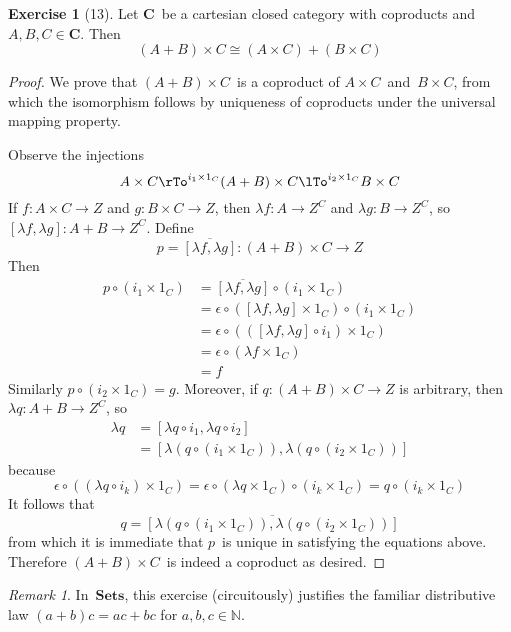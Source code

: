 \documentclass[letterpaper,12pt]{article}
\newcommand{\N}{\mathbb{N}}
\newcommand{\iso}{\cong}
\newcommand{\after}{\circ}
\newcommand{\eval}{\epsilon}
\newcommand{\copair}[2]{[{#1},{#2}]}
\newcommand{\cat}[1]{\mathbf{#1}}
\newcommand{\curry}[1]{\lambda{#1}}
\newcommand{\uncurry}[1]{\overline{#1}}
\newcommand{\C}{\cat{C}}
\newcommand{\Sets}{\cat{Sets}}
\theoremstyle{definition}
\newtheorem*{exer}{Exercise}
\theoremstyle{remark}
\newtheorem*{rmk}{Remark}
\theoremstyle{direction}
\begin{document}
\begin{exer}[13]
Let \(\C\)~be a cartesian closed category with coproducts and \(A,B,C\in\C\). Then
\[(A+B)\times C\iso(A\times C)+(B\times C)\]
\end{exer}
\begin{proof}
We prove that \((A+B)\times C\)~is a coproduct of \(A\times C\)~and~\(B\times C\), from which the isomorphism follows by uniqueness of coproducts under the universal mapping property.

Observe the injections
\[A\times C\rTo^{i_1\times1_C}(A+B)\times C\lTo^{i_2\times1_C}B\times C\]
If \(f:A\times C\to Z\) and \(g:B\times C\to Z\), then \(\curry{f}:A\to Z^C\) and \(\curry{g}:B\to Z^C\), so \(\copair{\curry{f}}{\curry{g}}:A+B\to Z^C\). Define
\[p=\uncurry{\copair{\curry{f}}{\curry{g}}}:(A+B)\times C\to Z\]
Then
\begin{align*}
p\after(i_1\times1_C)&=\uncurry{\copair{\curry{f}}{\curry{g}}}\after(i_1\times1_C)\\
	&=\eval\after(\copair{\curry{f}}{\curry{g}}\times1_C)\after(i_1\times1_C)\\
	&=\eval\after((\copair{\curry{f}}{\curry{g}}\after i_1)\times1_C)\\
	&=\eval\after(\curry{f}\times1_C)\\
	&=f
\end{align*}
Similarly \(p\after(i_2\times1_C)=g\). Moreover, if \(q:(A+B)\times C\to Z\) is arbitrary, then \(\curry{q}:A+B\to Z^C\), so
\begin{align*}
\curry{q}&=\copair{\curry{q}\after i_1}{\curry{q}\after i_2}\\
	&=\copair{\curry{(q\after(i_1\times1_C))}}{\curry{(q\after(i_2\times1_C))}}
\end{align*}
because
\[\eval\after((\curry{q}\after i_k)\times1_C)=\eval\after(\curry{q}\times1_C)\after(i_k\times1_C)=q\after(i_k\times1_C)\]
It follows that
\[q=\uncurry{\copair{\curry{(q\after(i_1\times1_C))}}{\curry{(q\after(i_2\times1_C))}}}\]
from which it is immediate that \(p\)~is unique in satisfying the equations above. Therefore \((A+B)\times C\)~is indeed a coproduct as desired. 
\end{proof}
\begin{rmk}
In~\(\Sets\), this exercise (circuitously) justifies the familiar distributive law \((a+b)c=ac+bc\) for \(a,b,c\in\N\).
\end{rmk}
\end{document}
